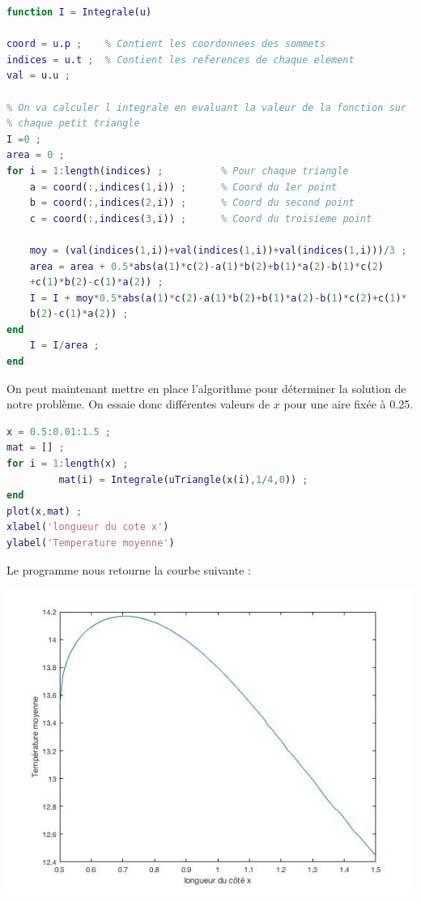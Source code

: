 \documentclass[a4paper,reqno]{article}
\begin{document}
\begin{lstlisting}[language=Matlab,frame=single,caption=Calcul de l'integrale]
function I = Integrale(u)

coord = u.p ;    % Contient les coordonnees des sommets 
indices = u.t ;  % Contient les references de chaque element
val = u.u ; 

% On va calculer l integrale en evaluant la valeur de la fonction sur
% chaque petit triangle 
I =0 ; 
area = 0 ; 
for i = 1:length(indices) ;          % Pour chaque triangle 
    a = coord(:,indices(1,i)) ;      % Coord du 1er point 
    b = coord(:,indices(2,i)) ;      % Coord du second point 
    c = coord(:,indices(3,i)) ;      % Coord du troisieme point
    
    moy = (val(indices(1,i))+val(indices(1,i))+val(indices(1,i)))/3 ;
    area = area + 0.5*abs(a(1)*c(2)-a(1)*b(2)+b(1)*a(2)-b(1)*c(2)
    +c(1)*b(2)-c(1)*a(2)) ; 
    I = I + moy*0.5*abs(a(1)*c(2)-a(1)*b(2)+b(1)*a(2)-b(1)*c(2)+c(1)*
    b(2)-c(1)*a(2)) ;
end
    I = I/area ; 
end
\end{lstlisting} 
On peut maintenant mettre en place l'algorithme pour déterminer la solution de notre problème. On essaie donc différentes valeurs de $x$ pour une aire fixée à 0.25.
\begin{lstlisting}[language=Matlab,frame=single,caption=Script Principal]
% Script principal 
x = 0.5:0.01:1.5 ; 
mat = [] ; 
for i = 1:length(x) ;
         mat(i) = Integrale(uTriangle(x(i),1/4,0)) ;
end
plot(x,mat) ; 
xlabel('longueur du cote x')
ylabel('Temperature moyenne')
\end{lstlisting}
\vspace{0.5cm}
Le programme nous retourne la courbe suivante : \\
\begin{center}
\includegraphics[scale=0.5]{Triangle_CourbeX.jpg}
\end{center}
\newpage
\end{document}
